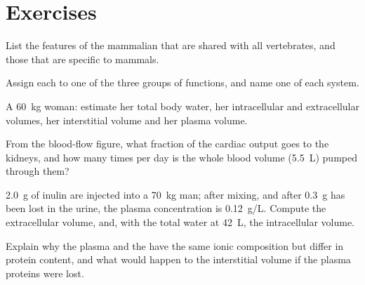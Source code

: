 \section{Exercises}

\begin{exercise}[$\star$]\label{exo:b1:mammal-organization:1}
List the features of the mammalian  that are shared with all
vertebrates, and those that are specific to mammals.
\end{exercise}

\begin{exercise}[$\star$]\label{exo:b1:mammal-organization:2}
Assign each  to one of the three groups of functions, and
name one  of each system.
\end{exercise}

\begin{exercise}[$\star$]\label{exo:b1:mammal-organization:3}
A \qty{60}{kg} woman: estimate her total body water, her intracellular
and extracellular volumes, her interstitial volume and her plasma
volume.
\end{exercise}

\begin{exercise}[$\star$]\label{exo:b1:mammal-organization:4}
From the blood-flow figure, what fraction of the cardiac output goes
to the kidneys, and how many times per day is the whole blood volume
(\qty{5.5}{L}) pumped through them?
\end{exercise}

\begin{exercise}[$\star\star$]\label{exo:b1:mammal-organization:5}
\qty{2.0}{g} of inulin are injected into a \qty{70}{kg} man; after
mixing, and after \qty{0.3}{g} has been lost in the urine, the plasma
concentration is \qty{0.12}{g/L}. Compute the extracellular volume,
and, with the total water at \qty{42}{L}, the intracellular volume.
\end{exercise}

\begin{exercise}[$\star\star$]\label{exo:b1:mammal-organization:6}
Explain why the plasma and the  have the same ionic
composition but differ in protein content, and what would happen to
the interstitial volume if the plasma proteins were lost.
\end{exercise}

